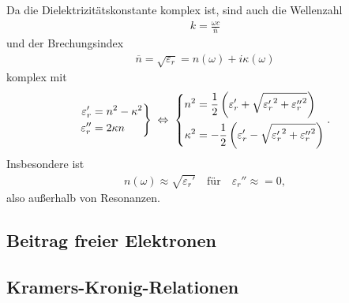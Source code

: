 Da die Dielektrizitätskonstante komplex ist, sind auch die Wellenzahl
\begin{align*}
    k=\frac{\omega c}{\overline{n}}
\end{align*}
und der Brechungsindex
\begin{align*}
    \overline{n} = \sqrt{\varepsilon_r}=n(\omega)+i\kappa(\omega)
\end{align*}
komplex mit
\begin{align*}
    \left.
    \begin{aligned}
        \varepsilon_r'  & = n^2-\kappa^2 \\
        \varepsilon_r'' & = 2\kappa n
    \end{aligned}
    \right\} \;\Leftrightarrow\; \left\{
    \begin{aligned}
        n^2      & = \frac{1}{2}\left(\varepsilon_r'+\sqrt{{\varepsilon_r'}^2+{\varepsilon_r''}^2}\right)  \\
        \kappa^2 & = -\frac{1}{2}\left(\varepsilon_r'-\sqrt{{\varepsilon_r'}^2+{\varepsilon_r''}^2}\right)
    \end{aligned}
    \right..
\end{align*}
Insbesondere ist
\begin{align*}
    n(\omega) \approx \sqrt{\varepsilon_r'} \quad \text{für} \quad \varepsilon_r'' \approx=0,
\end{align*}
also außerhalb von Resonanzen.








\subsection{Beitrag freier Elektronen\label{sec:freie_elektronen}}


\subsection{Kramers-Kronig-Relationen\label{sec:kramers_kronig_relation}}
